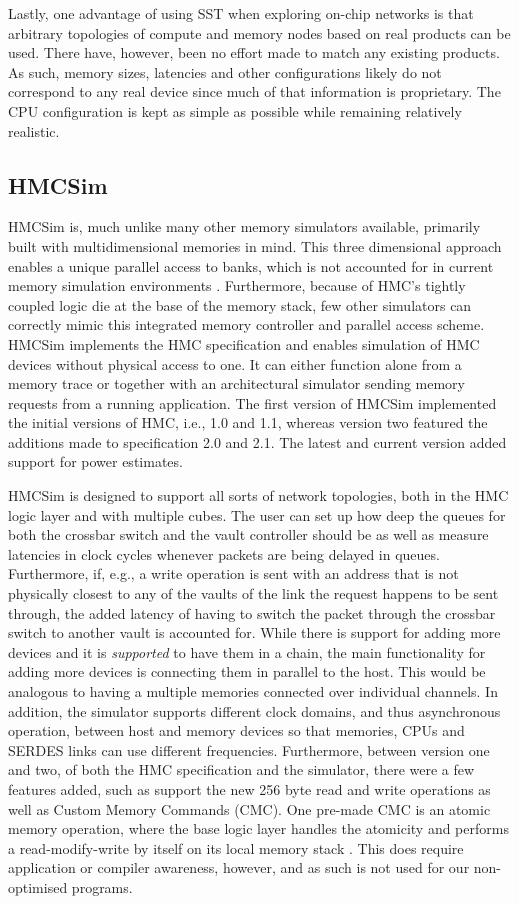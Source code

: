 Lastly, one advantage of using SST when exploring on-chip networks is that arbitrary topologies of compute and memory nodes based on real products can be used. There have, however, been no effort made to match any existing products. As such, memory sizes, latencies and other configurations likely do not correspond to any real device since much of that information is proprietary. The CPU configuration is kept as simple as possible while remaining relatively realistic.

\subsection{HMCSim} \label{HMC-Sim}
HMCSim is, much unlike many other memory simulators available, primarily built with multidimensional memories in mind. This three dimensional approach enables a unique parallel access to banks, which is not accounted for in current memory simulation environments \cite{6969550}. Furthermore, because of HMC's tightly coupled logic die at the base of the memory stack, few other simulators can correctly mimic this integrated memory controller and parallel access scheme. HMCSim implements the HMC specification and enables simulation of HMC devices without physical access to one. It can either function alone from a memory trace or together with an architectural simulator sending memory requests from a running application. The first version of HMCSim implemented the initial versions of HMC, i.e., 1.0 and 1.1, whereas version two featured the additions made to specification 2.0 and 2.1. The latest and current version added support for power estimates.
\bigskip

HMCSim is designed to support all sorts of network topologies, both in the HMC logic layer and with multiple cubes. The user can set up how deep the queues for both the crossbar switch and the vault controller should be as well as measure latencies in clock cycles whenever packets are being delayed in queues. Furthermore, if, e.g., a write operation is sent with an address that is not physically closest to any of the vaults of the link the request happens to be sent through, the added latency of having to switch the packet through the crossbar switch to another vault is accounted for. While there is support for adding more devices and it is \emph{supported} to have them in a chain, the main functionality for adding more devices is connecting them in parallel to the host. This would be analogous to having a multiple memories connected over individual channels. In addition, the simulator supports different clock domains, and thus asynchronous operation, between host and memory devices so that memories, CPUs and SERDES links can use different frequencies. Furthermore, between version one and two, of both the HMC specification and the simulator, there were a few features added, such as support the new 256 byte read and write operations as well as Custom Memory Commands (CMC). One pre-made CMC is an atomic memory operation, where the base logic layer handles the atomicity and performs a read-modify-write by itself on its local memory stack \cite{7529923}. This does require application or compiler awareness, however, and as such is not used for our non-optimised programs.
\bigskip

